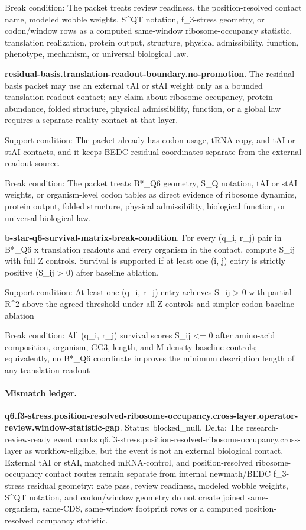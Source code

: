 Break condition: The packet treats review readiness, the position-resolved contact name, modeled wobble weights, S\textasciicircum{}QT notation, f\_3-stress geometry, or codon/window rows as a computed same-window ribosome-occupancy statistic, translation realization, protein output, structure, physical admissibility, function, phenotype, mechanism, or universal biological law.

\textbf{residual-basis.translation-readout-boundary.no-promotion}. The residual-basis packet may use an external tAI or stAI weight only as a bounded translation-readout contact; any claim about ribosome occupancy, protein abundance, folded structure, physical admissibility, function, or a global law requires a separate reality contact at that layer.

Support condition: The packet already has codon-usage, tRNA-copy, and tAI or stAI contacts, and it keeps BEDC residual coordinates separate from the external readout source.

Break condition: The packet treats B*\_Q6 geometry, S\_Q notation, tAI or stAI weights, or organism-level codon tables as direct evidence of ribosome dynamics, protein output, folded structure, physical admissibility, biological function, or universal biological law.

\textbf{b-star-q6-survival-matrix-break-condition}. For every (q\_i, r\_j) pair in B*\_Q6 x translation readouts and every organism in the contact, compute S\_ij with full Z controls. Survival is supported if at least one (i, j) entry is strictly positive (S\_ij > 0) after baseline ablation.

Support condition: At least one (q\_i, r\_j) entry achieves S\_ij > 0 with partial R\textasciicircum{}2 above the agreed threshold under all Z controls and simpler-codon-baseline ablation

Break condition: All (q\_i, r\_j) survival scores S\_ij <= 0 after amino-acid composition, organism, GC3, length, and M-density baseline controls; equivalently, no B*\_Q6 coordinate improves the minimum description length of any translation readout

\paragraph{Mismatch ledger.}
\textbf{q6.f3-stress.position-resolved-ribosome-occupancy.cross-layer.operator-review.window-statistic-gap}. Status: blocked\_null. Delta: The research-review-ready event marks q6.f3-stress.position-resolved-ribosome-occupancy.cross-layer as workflow-eligible, but the event is not an external biological contact. External tAI or stAI, matched mRNA-control, and position-resolved ribosome-occupancy contact routes remain separate from internal newmath/BEDC f\_3-stress residual geometry: gate pass, review readiness, modeled wobble weights, S\textasciicircum{}QT notation, and codon/window geometry do not create joined same-organism, same-CDS, same-window footprint rows or a computed position-resolved occupancy statistic.

